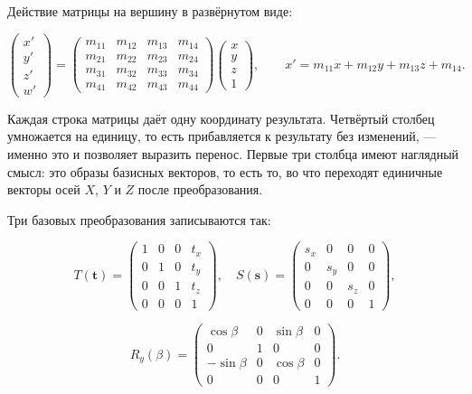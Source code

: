 \documentclass[14pt,a4paper]{extarticle}
\begin{document}
Действие матрицы на вершину в развёрнутом виде:

\begin{equation}
	\begin{pmatrix} x' \\ y' \\ z' \\ w' \end{pmatrix}
	=
	\begin{pmatrix}
		m_{11} & m_{12} & m_{13} & m_{14} \\
		m_{21} & m_{22} & m_{23} & m_{24} \\
		m_{31} & m_{32} & m_{33} & m_{34} \\
		m_{41} & m_{42} & m_{43} & m_{44}
	\end{pmatrix}
	\begin{pmatrix} x \\ y \\ z \\ 1 \end{pmatrix},
	\qquad
	x' = m_{11}x + m_{12}y + m_{13}z + m_{14}.
	\label{eq:apply}
\end{equation}

Каждая строка матрицы даёт одну координату результата. Четвёртый столбец
умножается на единицу, то есть прибавляется к результату без изменений, —
именно это и позволяет выразить перенос. Первые три столбца имеют наглядный
смысл: это образы базисных векторов, то есть то, во что переходят единичные
векторы осей $X$, $Y$ и $Z$ после преобразования.

Три базовых преобразования записываются так:

\begin{equation}
	T(\mathbf{t}) =
	\begin{pmatrix}
		1 & 0 & 0 & t_x \\
		0 & 1 & 0 & t_y \\
		0 & 0 & 1 & t_z \\
		0 & 0 & 0 & 1
	\end{pmatrix},
	\quad
	S(\mathbf{s}) =
	\begin{pmatrix}
		s_x & 0 & 0 & 0 \\
		0 & s_y & 0 & 0 \\
		0 & 0 & s_z & 0 \\
		0 & 0 & 0 & 1
	\end{pmatrix},
\end{equation}

\begin{equation}
	R_y(\beta) =
	\begin{pmatrix}
		\cos\beta & 0 & \sin\beta & 0 \\
		0 & 1 & 0 & 0 \\
		-\sin\beta & 0 & \cos\beta & 0 \\
		0 & 0 & 0 & 1
	\end{pmatrix}.
\end{equation}
\end{document}

